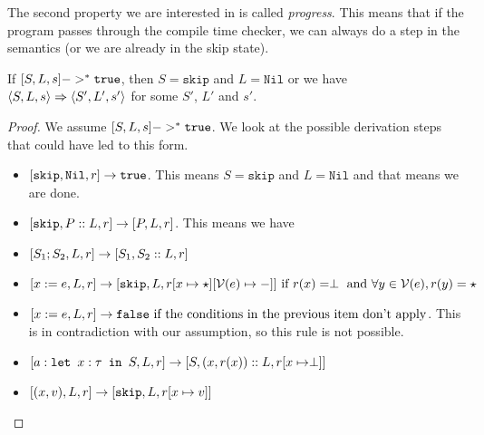 The second property we are interested in is called \emph{progress}. This means that if the program passes through the compile time checker, we can always do a step in the semantics (or we are already in the skip state). %

\begin{theorem}
If $[ S, L, s ] ->^* \texttt{true}$, then $S = \texttt{skip}$ and $L = \texttt{Nil}$ or we have $\langle S, L, s \rangle \Rightarrow \langle S', L', s' \rangle$ for some $S'$, $L'$ and $s'$.
\end{theorem}

\begin{proof}
We assume $[ S, L, s ] ->^* \texttt{true}$. We look at the possible derivation steps that could have led to this form. 
\begin{itemize}
    \item $[ \texttt{skip}, \texttt{Nil}, r ] \to \texttt{true}$. This means $S = \texttt{skip}$ and $L = \texttt{Nil}$ and that means we are done.
    \item $[ \texttt{skip}, P::L,  r ] \to [ P, L, r ]$. This means we have 
    \item $[ S_1; S_2, L, r ] \to [ S_1, S_2::L, r ]$
    \item $[ x:=e, L, r ] \to [ \texttt{skip}, L, r[x\mapsto \star][\mathcal{V}(e) \mapsto -] ] \textrm{ if }r(x) = \perp \textrm{ and } \forall y \in \mathcal{V}(e), r(y) = \star$
    \item $[ x:=e, L, r ] \to \texttt{false} \textrm{  if the conditions in the previous item don't apply}$. This is in contradiction with our assumption, so this rule is not possible. 
    \item $[ a : \texttt{let }x : \tau \texttt{ in } S, L, r ] \to [ S, (x,r(x))::L, r[x\mapsto \perp] ]$
    \item $[ (x,v), L, r ] \to [ \texttt{skip}, L, r[x \mapsto v] ]$
\end{itemize}
\end{proof}





